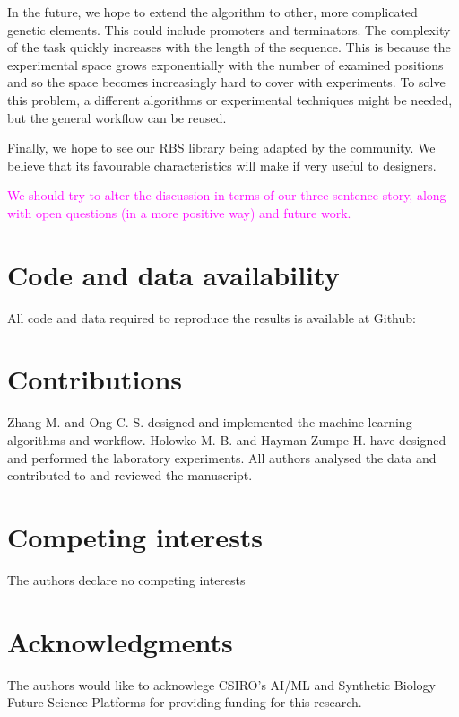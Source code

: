 \documentclass{article}
\newcommand{\mengyan}[1]{\textcolor{magenta}{#1}}
\begin{document}
In the future, we hope to extend the algorithm to other, more complicated genetic elements.
This could include promoters and terminators.
The complexity of the task quickly increases with the length of the sequence.
This is because the experimental space grows exponentially with the number of examined positions and so the space becomes increasingly hard to cover with experiments.
To solve this problem, a different algorithms or experimental techniques might be needed, but the general workflow can be reused.

Finally, we hope to see our RBS library being adapted by the community.
We believe that its favourable characteristics will make if very useful to designers.

\mengyan{We should try to alter the discussion in terms of our three-sentence story, along with open questions (in a more positive way) and future work.}



\section*{Code and data availability}

All code and data required to reproduce the results is available at Github: 

\section*{Contributions}
Zhang M. and Ong C. S. designed and implemented the machine learning algorithms and workflow. Holowko M. B. and Hayman Zumpe H. have designed and performed the laboratory experiments. All authors analysed the data and contributed to and reviewed the manuscript.

\section*{Competing interests}
The authors declare no competing interests

\section*{Acknowledgments}
The authors would like to acknowlege CSIRO's AI/ML and Synthetic Biology Future Science Platforms for providing funding for this research.


\newpage

\printbibliography

\clearpage

\appendix

\end{document}
